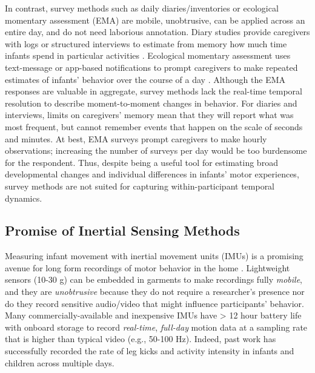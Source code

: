 \documentclass[
  man]{apa6}
\begin{document}
In contrast, survey methods such as daily diaries/inventories or ecological momentary assessment (EMA) are mobile, unobtrusive, can be applied across an entire day, and do not need laborious annotation. Diary studies provide caregivers with logs or structured interviews to estimate from memory how much time infants spend in particular activities \autocite{MajnemerBarr2005,KarasikKuchirko2022}. Ecological momentary assessment uses text-message or app-based notifications to prompt caregivers to make repeated estimates of infants' behavior over the course of a day \autocite{Survey,KadookaCaufield2021}. Although the EMA responses are valuable in aggregate, survey methods lack the real-time temporal resolution to describe moment-to-moment changes in behavior. For diaries and interviews, limits on caregivers' memory mean that they will report what was most frequent, but cannot remember events that happen on the scale of seconds and minutes. At best, EMA surveys prompt caregivers to make hourly observations; increasing the number of surveys per day would be too burdensome for the respondent. Thus, despite being a useful tool for estimating broad developmental changes and individual differences in infants' motor experiences, survey methods are not suited for capturing within-participant temporal dynamics.

\hypertarget{promise-of-inertial-sensing-methods}{%
\subsection{Promise of Inertial Sensing Methods}\label{promise-of-inertial-sensing-methods}}

Measuring infant movement with inertial movement units (IMUs) is a promising avenue for long form recordings of motor behavior in the home \autocite{CliffReilly2009,Barbaro2019,BruijnsTruelove2020,LoboHall2019}. Lightweight sensors (10-30 g) can be embedded in garments to make recordings fully \emph{mobile}, and they are \emph{unobtrusive} because they do not require a researcher's presence nor do they record sensitive audio/video that might influence participants' behavior. Many commercially-available and inexpensive IMUs have \textgreater{} 12 hour battery life with onboard storage to record \emph{real-time}, \emph{full-day} motion data at a sampling rate that is higher than typical video (e.g., 50-100 Hz). Indeed, past work has successfully recorded the rate of leg kicks \autocite[e.g.,][]{DengTrujillo-Priego2019} and activity intensity \autocite{SchnellerBentsen2017} in infants and children across multiple days.
\end{document}
